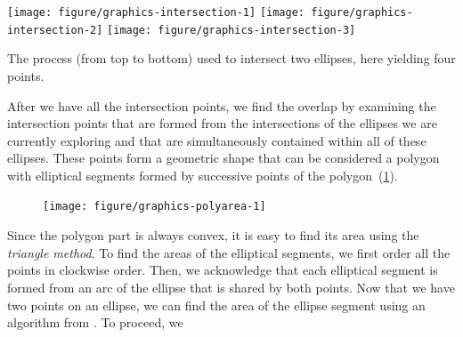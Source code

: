 \documentclass[
  oneside,
  openany,
  numbers=noendperiod,
  parskip=half,
  bibliography=totoc
]{scrbook}\usepackage[]{graphicx}\usepackage{xcolor}
\newenvironment{knitrout}{}{} %
\begin{document}
\begin{marginfigure}
\begin{knitrout}\small
{}\color{fgcolor}

{\centering \texttt{[image: figure/graphics-intersection-1]} 
\texttt{[image: figure/graphics-intersection-2]} 
\texttt{[image: figure/graphics-intersection-3]} 

}



\end{knitrout}
\caption{The process (from top to bottom) used to intersect two ellipses, here
yielding four points.}
\label{fig:intersection}
\end{marginfigure}

After we have all the intersection points, we find the overlap by examining the
intersection points that are formed from the intersections of the ellipses we
are currently exploring and that are simultaneously contained within all of
these ellipses. These points form a geometric shape that can be considered a
polygon with elliptical segments formed by successive points of the
polygon~(\cref{fig:polyarea}).

\begin{figure}[hbt]
\begin{knitrout}\small
{}\color{fgcolor}

{\centering \texttt{[image: figure/graphics-polyarea-1]} 

}



\end{knitrout}
\label{fig:polyarea}
\end{figure}

Since the polygon part is always convex, it is easy to find its area using the
\emph{triangle method}. To find the areas of the elliptical segments, we first
order all the points in clockwise order. Then, we acknowledge that each
elliptical segment is formed from an arc of the ellipse that is shared by both
points. Now that we have
two points on an ellipse, we can find the area of the ellipse segment using an
algorithm from \citet{eberly_area_2016}. To proceed, we
\end{document}

